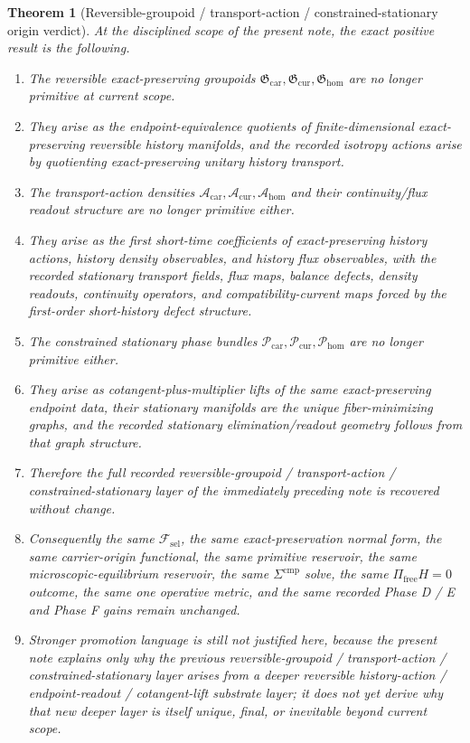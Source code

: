 \documentclass[11pt]{article}
\newcommand{\StemFunctional}{\mathscr F_{\mathrm{sel}}}
\newcommand{\TensorGroupoid}{\mathfrak G_{\mathrm{car}}}
\newcommand{\CurGroupoid}{\mathfrak G_{\mathrm{cur}}}
\newcommand{\HomGroupoid}{\mathfrak G_{\mathrm{hom}}}
\newcommand{\TensorActionDensity}{\mathscr A_{\mathrm{car}}}
\newcommand{\CurActionDensity}{\mathscr A_{\mathrm{cur}}}
\newcommand{\HomActionDensity}{\mathscr A_{\mathrm{hom}}}
\newcommand{\TensorPhaseClass}{\mathscr P_{\mathrm{car}}}
\newcommand{\CurPhaseClass}{\mathscr P_{\mathrm{cur}}}
\newcommand{\HomPhaseClass}{\mathscr P_{\mathrm{hom}}}
\newtheorem{theorem}{Theorem}
\begin{document}
\begin{theorem}[Reversible-groupoid / transport-action / constrained-stationary origin verdict]
\label{thm:verdict}
At the disciplined scope of the present note, the exact positive result is the following.
\begin{enumerate}
    \item The reversible exact-preserving groupoids \(\TensorGroupoid,\CurGroupoid,\HomGroupoid\) are no longer primitive at current scope.
    \item They arise as the endpoint-equivalence quotients of finite-dimensional exact-preserving reversible history manifolds, and the recorded isotropy actions arise by quotienting exact-preserving unitary history transport.
    \item The transport-action densities \(\TensorActionDensity,\CurActionDensity,\HomActionDensity\) and their continuity/flux readout structure are no longer primitive either.
    \item They arise as the first short-time coefficients of exact-preserving history actions, history density observables, and history flux observables, with the recorded stationary transport fields, flux maps, balance defects, density readouts, continuity operators, and compatibility-current maps forced by the first-order short-history defect structure.
    \item The constrained stationary phase bundles \(\TensorPhaseClass,\CurPhaseClass,\HomPhaseClass\) are no longer primitive either.
    \item They arise as cotangent-plus-multiplier lifts of the same exact-preserving endpoint data, their stationary manifolds are the unique fiber-minimizing graphs, and the recorded stationary elimination/readout geometry follows from that graph structure.
    \item Therefore the full recorded reversible-groupoid / transport-action / constrained-stationary layer of the immediately preceding note is recovered without change.
    \item Consequently the same \(\StemFunctional\), the same exact-preservation normal form, the same carrier-origin functional, the same primitive reservoir, the same microscopic-equilibrium reservoir, the same \(\Sigma^{\mathrm{cmp}}\) solve, the same \(\Pi_{\mathrm{free}}H=0\) outcome, the same one operative metric, and the same recorded Phase D / E and Phase F gains remain unchanged.
    \item Stronger promotion language is still not justified here, because the present note explains only why the previous reversible-groupoid / transport-action / constrained-stationary layer arises from a deeper reversible history-action / endpoint-readout / cotangent-lift substrate layer; it does not yet derive why that new deeper layer is itself unique, final, or inevitable beyond current scope.

\end{enumerate}
\end{theorem}
\end{document}
